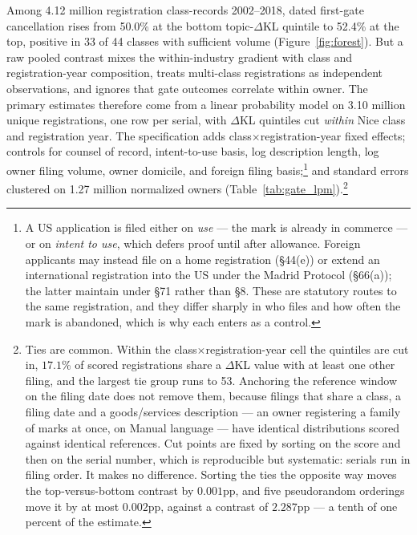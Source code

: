 \documentclass[11pt]{article}
\newcommand{\dkl}{$\Delta$KL}
\begin{document}
Among 4.12 million registration class-records 2002--2018, dated first-gate cancellation rises from 50.0\%
at the bottom topic-\dkl{} quintile to 52.4\% at the top, positive in 33
of 44 classes with sufficient volume (Figure~\ref{fig:forest}). But a raw
pooled contrast mixes the within-industry gradient with class and registration-year
composition, treats multi-class registrations as independent observations,
and ignores that gate outcomes correlate within owner. The
primary estimates therefore come from a linear probability model on 3.10
million unique registrations, one row per serial, with \dkl{} quintiles cut
\emph{within} Nice class and registration year. The specification adds
class$\times$registration-year fixed effects; controls for counsel of record,
intent-to-use basis, log description length, log owner filing volume, owner
domicile, and foreign filing basis;\footnote{A US application is filed
either on \emph{use} --- the mark is already in commerce --- or on
\emph{intent to use}, which defers proof until after allowance. Foreign
applicants may instead file on a home registration (\S44(e)) or extend an
international registration into the US under the Madrid Protocol
(\S66(a)); the latter maintain under \S71 rather than \S8. These are
statutory routes to the same registration, and they differ sharply in who
files and how often the mark is abandoned, which is why each enters as a
control.} and standard errors clustered on 1.27
million normalized owners (Table~\ref{tab:gate_lpm}).\footnote{Ties are
common. Within the class$\times$registration-year cell the quintiles are cut in,
$17.1$\% of scored registrations share a \dkl{} value with at least one
other filing, and the largest tie group runs to 53. Anchoring the reference
window on the filing date does not remove them, because filings that share a
class, a filing date and a goods/services description --- an owner
registering a family of marks at once, on Manual language --- have identical
distributions scored against identical references. Cut points are fixed by
sorting on the score and then on the serial number, which is reproducible
but systematic: serials run in filing order. It makes no difference. Sorting
the ties the opposite way moves the top-versus-bottom contrast by $0.001$pp,
and five pseudorandom orderings move it by at most $0.002$pp, against a
contrast of $2.287$pp --- a tenth of one percent of the estimate.}
\end{document}

